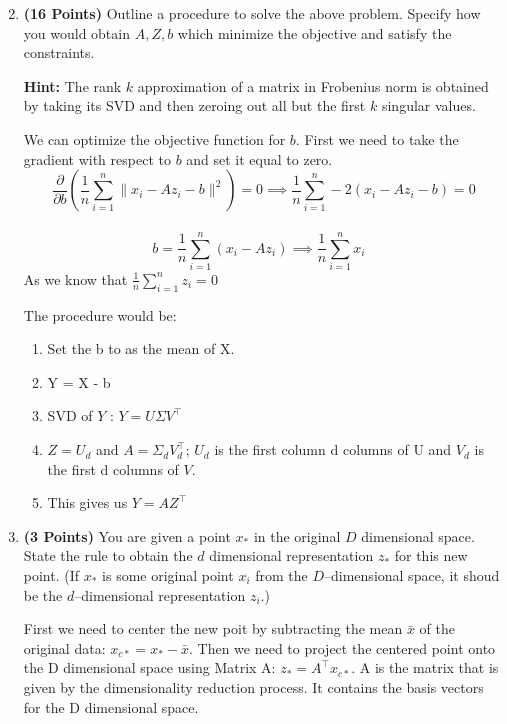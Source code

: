 \documentclass[a4paper]{article}
\theoremstyle{definition}
\newenvironment{soln}{
    \leavevmode\color{blue}\ignorespaces
}{}
\begin{document}
\begin{enumerate}
\setcounter{enumi}{1}
\item \textbf{(16 Points)}
Outline a procedure to solve the above problem. Specify how you
would obtain $A, Z, b$ which minimize the objective and satisfy the constraints.

\textbf{Hint: }The rank $k$ approximation of a matrix in Frobenius norm is obtained by
taking its SVD and then zeroing out all but the first $k$ singular values.

\begin{soln}
    We can optimize the objective function for $b$. First we need to take the gradient with respect to $b$ and set it equal to zero.\\
    
        $$\frac{\partial}{\partial b} ( \frac{1}{n} \sum_{i = 1}^{n} \|x_i - Az_i - b\|^2 ) = 0 \implies \frac{1}{n} \sum_{i = 1}^{n} -2(x_i - Az_i - b) = 0$$\\
        $$b = \frac{1}{n} \sum_{i = 1}^{n} (x_i - Az_i) \implies \frac{1}{n} \sum_{i = 1}^{n} x_i \,\;\; $$
        As we know that $\frac{1}{n} \sum_{i = 1}^{n} z_i = 0$

    
    The procedure would be: \\
    \begin{enumerate}
        \item Set the b to as the mean of X.
        \item Y = X - b
        \item SVD of $Y$ : $Y = U \Sigma V^\top$
        \item $Z = U_d$ and $A = \Sigma_dV_d^\top$; $U_d$ is the first column d columns of U and $V_d$ is the first d columns of $V$.
        \item This gives us $Y = A Z^\top$
    \end{enumerate}
\end{soln}


\item \textbf{(3 Points)}
You are given a point $x_*$ in the original $D$ dimensional space.
State the rule to obtain the $d$ dimensional
representation $z_*$ for this new point.
(If $x_*$ is some original point $x_i$ from the $D$--dimensional space, it shoud be the
$d$--dimensional representation $z_i$.)

\begin{soln}
    First we need to center the new poit by subtracting the mean \( \bar{x} \) of the original data: $x_{c*} = x_* - \bar{x}$. Then
    we need to project the centered point onto the D dimensional space using Matrix A: $z_* = A^\top x_{c*}$. A is the matrix
    that is given by the dimensionality reduction process. It contains the basis vectors for the D dimensional space.
\end{soln}


\end{enumerate}
\end{document}
